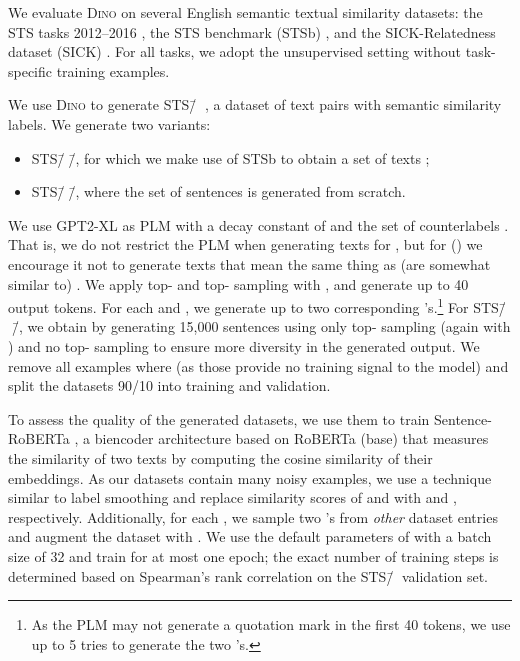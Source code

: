 \documentclass[11pt]{article}
\newcommand\ours{\textsc{Dino}}
\newcommand\ourDs{STS\=/🦕}
\newcommand\ourDsFull{STS\=/🦕\=/}
\newcommand\ourDsSemi{STS\=/🦕\=/}
\begin{document}
We evaluate \ours{} on several English semantic
textual similarity datasets: the STS tasks 2012--2016 \citep{10.5555/2387636.2387697,agirre-etal-2013-sem,agirre-etal-2014-semeval,agirre-etal-2015-semeval,agirre-etal-2016-semeval},
the STS benchmark (STSb) \citep{cer-etal-2017-semeval}, and
the SICK-Relatedness dataset
(SICK) \citep{marelli-etal-2014-sick}. For all tasks, we
adopt the unsupervised setting without task-specific training examples.

We use \ours{} to generate \ourDs{} , a dataset
of text pairs with semantic similarity labels. We generate two variants:
\begin{itemize}[topsep=0.5em]
	\setlength\itemsep{-0.1em}
	\item \ourDsSemi{}, for which we make use of STSb to obtain a set of
	texts ;
	\item \ourDsFull{}, where the set of sentences  is generated from scratch.
\end{itemize}
We use GPT2-XL as PLM with
a decay constant of 
and the
set of counterlabels
. That is, we do not restrict the PLM when generating texts for , but for  () we encourage it not to generate texts  that mean the same thing as (are somewhat similar to) . We apply
top- \citep{Holtzman2020The} and
top- \citep{fan-etal-2018-hierarchical,holtzman-etal-2018-learning}
sampling with ,  and generate up to 40
output tokens. For each  and , we generate up to two corresponding
's.\footnote{As the PLM may not 
generate a quotation mark in the first 40
tokens, we use up to 5 tries to generate the two
's.}
For \ourDsFull{}, we obtain  by generating 15,000 sentences using only top- sampling (again with ) and no top- sampling to ensure more diversity in the generated output.
We remove all examples where  (as those provide no training signal to the model) and 
split the datasets 90/10 into training and validation.

To assess the quality of the generated datasets, we use them to train Sentence-RoBERTa \citep{reimers-gurevych-2019-sentence}, a biencoder architecture based on RoBERTa (base) \citep{liu2019roberta} that measures the similarity of two texts by computing the cosine similarity of their embeddings. 
As our datasets contain many noisy examples, we use a technique similar to label smoothing \citep{szegedy2016rethinking} and replace similarity scores of  and  with  and , respectively.
Additionally, for each , we sample two
's from \emph{other} dataset entries and
augment the dataset with . We use the default parameters
of \citet{reimers-gurevych-2019-sentence} with a batch size
of 32 and train for at most one epoch; the exact number of
training steps is determined based on Spearman's rank correlation on the \ourDs{} validation set.
\end{document}
